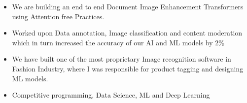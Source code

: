 






















\begin{itemize}
\item We are building an end to end Document Image Enhancement Transformers using Attention free Practices.

\end{itemize}

\divider


\begin{itemize}
\item Worked upon Data annotation, Image classification and content moderation which in turn increased the accuracy of our AI and ML models by 2\%


\end{itemize}

\divider

\begin{itemize}
\item We have built one of the most proprietary Image recognition software in Fashion Industry, where I was responsible for product tagging and designing ML models. 

\end{itemize}

\divider





\begin{itemize}
\item \textcolor{emphasis}{Competitive programming, Data Science, ML and Deep Learning} 
\smallskip
\end{itemize}

